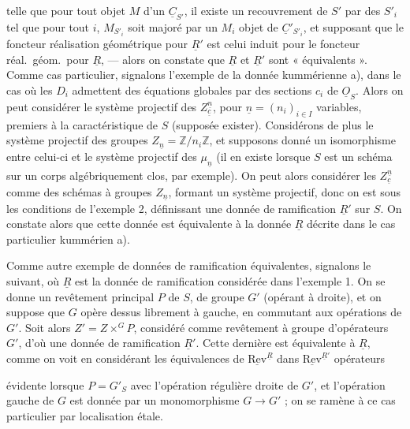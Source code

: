 \documentclass[11pt,a4paper]{article}
\begin{document}
telle que pour tout objet $M$ d'un $\underline{C}_{S'}$, il existe un
recouvrement de $S'$ par des $S'_i$ tel que pour tout $i$, $M_{S'_i}$ soit
 majoré par un $M_i$ objet de $\underline{C}'_{S'_i}$,
\struck{\ill{}} et supposant que le foncteur réalisation géométrique pour
$\underline{R}'$ est celui induit pour le foncteur réal.\ géom.\ pour
$\underline{R}$, --- alors on constate que $\underline{R}$ et $\underline{R}'$
sont « équivalents ». Comme cas particulier, signalons l'exemple de la donnée
kummérienne a), dans le cas où les $D_i$ admettent des équations globales par
des sections $c_i$ de $\underline{O}_S$. Alors on peut considérer le système
projectif des $Z^{\underline{n}}_{\underline{c}}$, pour $\underline{n} =
(n_i)_{i \in I}$ variables, premiers 
à la caractéristique de $S$ (supposée exister). Considérons de plus le système
projectif des groupes $Z_{\underline{n}} = \mathbb{Z}/n_i\mathbb{Z}$, et
supposons donné un isomorphisme entre celui-ci et le système projectif des
$\mu_{\underline{n}}$ (il en existe lorsque $S$ est un schéma sur un corps
algébriquement clos, par exemple). On peut alors considérer les
$Z^{\underline{n}}_{\underline{c}}$ comme des schémas à groupes
$Z_{\underline{n}}$, formant un système projectif, \struck{\ill{}} donc on est
sous les conditions de l'exemple 2, définissant une donnée de ramification
$\underline{R}'$ sur $S$. On constate alors que cette donnée est équivalente à
la donnée $\underline{R}$ décrite dans le cas particulier kummérien a).

Comme autre exemple de données de ramification équivalentes, signalons le
suivant, où $\underline{R}$ est la donnée de ramification considérée dans
l'exemple 1. On se donne un revêtement principal $P$ de $S$, de groupe $G'$
(opérant à droite), et on suppose que $G$ opère dessus librement à gauche, en
commutant aux opérations de $G'$. Soit alors $Z' = Z \times^G P$, considéré
comme revêtement à groupe d'opérateurs $G'$, d'où une donnée de ramification
$\underline{R}'$. Cette dernière est équivalente à $\underline{R}$, comme on
voit en considérant les équivalences  de
\struck{\ill{}}  $\underline{\mathrm{Rev}}^{\underline{R}}$ dans
$\underline{\mathrm{Rev}}^{\underline{R}'}$ \ill{} opérateurs

évidente lorsque $P = G'_S$ avec l'opération régulière droite de $G'$, et
l'opération gauche de $G$ est donnée par un monomorphisme $G \to G'$ ; on se
ramène à ce cas particulier par localisation étale.
\end{document}
